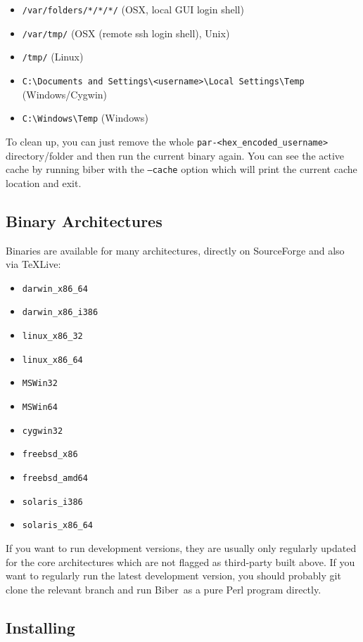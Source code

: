 \documentclass{ltxdockit}
\newcommand*{\biber}{Biber\xspace}
\begin{document}
\begin{itemize}
\item \verb+/var/folders/*/*/*/+ (OSX, local GUI login shell)
\item \verb+/var/tmp/+ (OSX (remote ssh login shell), Unix)
\item \verb+/tmp/+ (Linux)
\item \verb+C:\Documents and Settings\<username>\Local Settings\Temp+ (Windows/Cygwin)
\item \verb+C:\Windows\Temp+ (Windows)
\end{itemize}

\noindent To clean up, you can just remove the whole \verb+par-<hex_encoded_username>+
directory/folder and then run the current binary again. You can see the active cache by running biber with the \texttt{--cache} option which will print the current cache location and exit.

\subsection{Binary Architectures}

Binaries are available for many architectures, directly on SourceForge and
also via \TeX Live:

\begin{itemize}
\item \verb+darwin_x86_64+
\item \verb+darwin_x86_i386+
\item \verb+linux_x86_32+
\item \verb+linux_x86_64+
\item \verb+MSWin32+
\item \verb+MSWin64+
\item \verb+cygwin32+\tpb
\item \verb+freebsd_x86+\tpb
\item \verb+freebsd_amd64+\tpb
\item \verb+solaris_i386+\tpb
\item \verb+solaris_x86_64+\tpb
\end{itemize}

\noindent If you want to run development versions, they are usually only
regularly updated for the core architectures which are not flagged as
third-party built above. If you want to regularly run the latest
development version, you should probably git clone the relevant branch and
run \biber\ as a pure Perl program directly.

\subsection{Installing}
\end{document}
